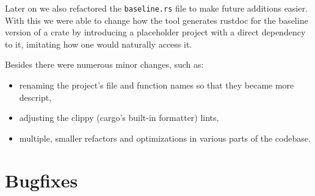 \documentclass[licencjacka,en]{pracamgr}
\begin{document}

Later on we also refactored the \texttt{baseline.rs} file to make future additions easier. With this
we were able to change how the tool generates rustdoc for the baseline version of a crate
by introducing a placeholder project with a direct dependency to it, imitating how one would
naturally access it.

Besides there were numerous minor changes, such as:
\begin{itemize}
	\item renaming the project's file and function names so that they became more descript,
	\item adjusting the clippy (cargo's built-in formatter) lints,
	\item multiple, smaller refactors and optimizations in various parts of the codebase.
\end{itemize}

\section{Bugfixes}\label{r:section_bugfixes}
\end{document}
